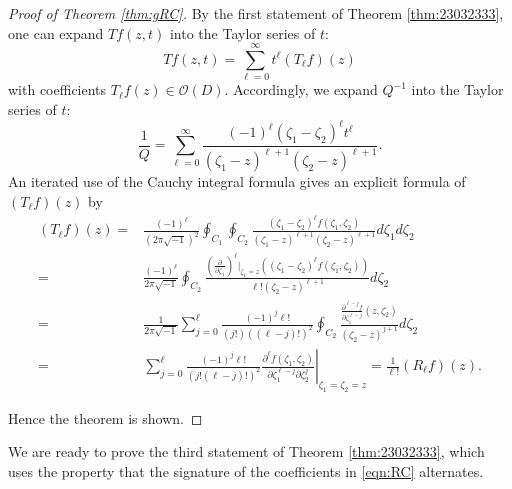 \documentclass[12pt,leqno]{amsart}
\theoremstyle{plain}
\theoremstyle{definition}
\begin{document}
\begin{proof}
[Proof of Theorem \ref{thm:gRC}]
By the first statement of Theorem \ref{thm:23032333}, 
 one can expand $T f(z,t)$
 into the Taylor series of $t$:
\[
   T f(z,t)=\sum_{\ell=0}^\infty t^{\ell} (T_{\ell} f)(z)
\]
with coefficients $T_{\ell}f(z) \in {\mathcal{O}}(D)$.  
Accordingly, 
we expand $Q^{-1}$ into the Taylor series of $t$:
\begin{equation}
\label{eqn:QTaylor}
  \frac 1 Q
  =
  \sum_{\ell=0}^\infty \frac{(-1)^{\ell}(\zeta_1-\zeta_2)^{\ell}t^{\ell}}{(\zeta_1-z)^{\ell+1}(\zeta_2-z)^{\ell+1}}.  
\end{equation}
An iterated use of the Cauchy integral formula
 gives an explicit formula of $(T_{\ell} f)(z)$ by 
\begin{align*}
(T_{\ell} f)(z) =& \frac{(-1)^{\ell}}{(2 \pi \sqrt{-1})^2}
              \oint_{C_1} \oint_{C_2}
              \frac{(\zeta_1-\zeta_2)^{\ell} f (\zeta_1, \zeta_2)}
                   {(\zeta_1-z)^{\ell+1}(\zeta_2-z)^{\ell+1}}
             d \zeta_1 d \zeta_2
\\
=& \frac{(-1)^{\ell}}{2 \pi \sqrt{-1}}
              \oint_{C_2} 
              \frac{(\frac{\partial}{\partial \zeta_1})^{\ell}|_{\zeta_1=z}
((\zeta_1-\zeta_2)^{\ell} f (\zeta_1, \zeta_2))}
                   {\ell ! (\zeta_2-z)^{\ell+1}}
             d \zeta_2
\\
=& \frac{1}{2 \pi \sqrt{-1}}
\sum_{j=0}^{\ell}
\frac{(-1)^j \ell!}
{(j!) ((\ell-j)!)^2}
\oint_{C_2} 
\frac{\frac{\partial^{\ell-j} f}{\partial \zeta_1^{\ell-j}} (z, \zeta_2)}
{(\zeta_2-z)^{j+1}}
             d \zeta_2
\\
=& \sum_{j=0}^{\ell}
              \left. 
              \frac{(-1)^j \ell!}{(j! (\ell-j)!)^2}
              \frac {\partial^{\ell} f(\zeta_1, \zeta_2)}{\partial \zeta_1^{\ell-j}\partial \zeta_2^j}\right|_{\zeta_1=\zeta_2=z}
=\frac 1 {\ell !}(R_{\ell} f)(z).  
\end{align*}

Hence the theorem is shown.  
\end{proof}



We are ready to prove the third statement
 of Theorem \ref{thm:23032333}, 
 which uses the property 
 that the signature of the coefficients in \eqref{eqn:RC} alternates.  
\end{document}

